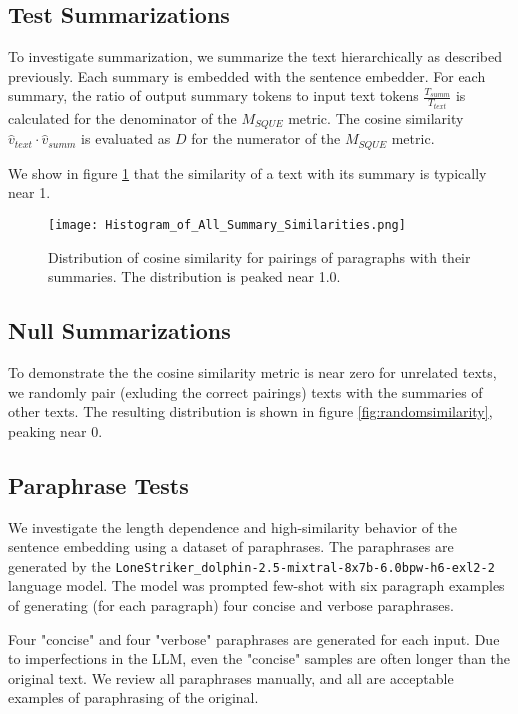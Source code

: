 \documentclass{article}
\begin{document}
{\subsection{Test Summarizations}

To investigate summarization, we summarize the text hierarchically as described previously.  
Each summary is embedded with the sentence embedder.  
For each summary, the ratio of output summary tokens to input text tokens $\frac{T_{summ}}{T_{text}}$ is calculated for the denominator of the $M_{SQUE}$ metric.  
The cosine similarity $\hat{v}_{text}\cdot\hat{v}_{summ}$ is evaluated as $D$ for the numerator of the $M_{SQUE}$ metric.

We show in figure \ref{fig:summary_similarities} that the similarity of a text with its summary is typically near 1.

\begin{figure}
	\centering
	\texttt{[image: Histogram\_of\_All\_Summary\_Similarities.png]}
	\caption{Distribution of cosine similarity for pairings of paragraphs with their summaries.  The distribution is peaked near 1.0.}
	\label{fig:summary_similarities}
\end{figure}

\subsection{Null Summarizations}

To demonstrate the the cosine similarity metric is near zero for unrelated texts, we randomly pair (exluding the correct pairings) texts with the summaries of other texts.  
The resulting distribution is shown in figure \ref{fig:randomsimilarity}, peaking near 0.

\subsection{Paraphrase Tests}

We investigate the length dependence and high-similarity behavior of the sentence embedding using a dataset of paraphrases.  
The paraphrases are generated by the \texttt{LoneStriker\_dolphin-2.5-mixtral-8x7b-6.0bpw-h6-exl2-2} language model.  
The model was prompted few-shot with six paragraph examples of generating (for each paragraph) four concise and verbose paraphrases.

Four "concise" and four "verbose" paraphrases are generated for each input. 
Due to imperfections in the LLM, even the "concise" samples are often longer than the original text.
We review all paraphrases manually, and all are acceptable examples of paraphrasing of the original.

}
\end{document}
